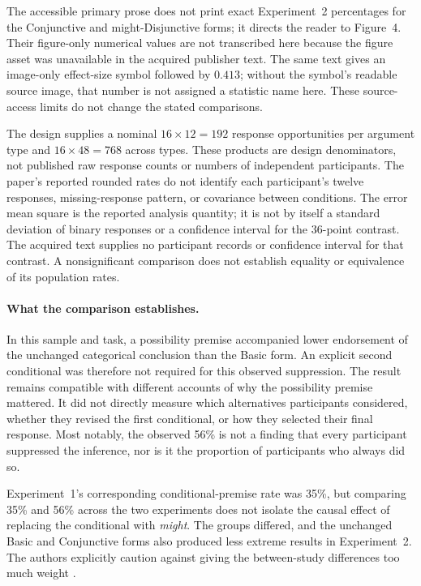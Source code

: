 The accessible primary prose does not print exact Experiment~2 percentages
for the Conjunctive and might-Disjunctive forms; it directs the reader to
Figure~4. Their figure-only numerical values are not transcribed here because
the figure asset was unavailable in the acquired publisher text. The same
text gives an image-only effect-size symbol followed by \(0.413\); without
the symbol's readable source image, that number is not assigned a statistic
name here. These source-access limits do not change the stated comparisons.

The design supplies a nominal \(16\times12=192\) response opportunities per
argument type and \(16\times48=768\) across types. These products are design
denominators, not published raw response counts or numbers of independent
participants. The paper's reported rounded rates do not identify each
participant's twelve responses, missing-response pattern, or covariance
between conditions. The error mean square is the reported analysis quantity;
it is not by itself a standard deviation of binary responses or a confidence
interval for the 36-point contrast. The acquired text supplies no participant
records or confidence interval for that contrast. A nonsignificant comparison
does not establish equality or equivalence of its population rates.

\paragraph{What the comparison establishes.}
In this sample and task, a possibility premise accompanied lower endorsement
of the unchanged categorical conclusion than the Basic form. An explicit
second conditional was therefore not required for this observed suppression.
The result remains compatible with different accounts of why the possibility
premise mattered. It did not directly measure which alternatives participants
considered, whether they revised the first conditional, or how they selected
their final response. Most notably, the observed 56\% is not a finding that
every participant suppressed the inference, nor is it the proportion of
participants who always did so.

Experiment~1's corresponding conditional-premise rate was 35\%, but comparing
35\% and 56\% across the two experiments does not isolate the causal effect
of replacing the conditional with \emph{might}. The groups differed, and the
unchanged Basic and Conjunctive forms also produced less extreme results in
Experiment~2. The authors explicitly caution against giving the between-study
differences too much weight \cite[Sec.~5.4]{CarianiRips2017Suppression}.

